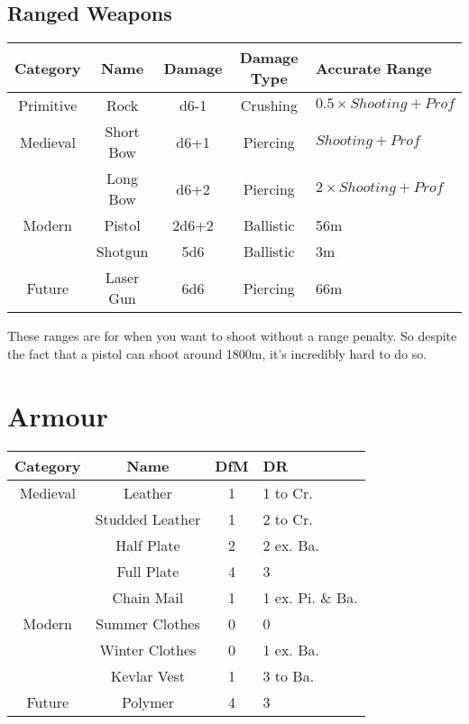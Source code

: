 \subsection{Ranged Weapons}
\begin{center}
\begin{tabular}{c|c|c|c|l}
    \textbf{Category} & \textbf{Name} & \textbf{Damage} & \textbf{Damage Type} & \textbf{Accurate Range} \\\hline
    Primitive & Rock        & d6-1  & Crushing & $0.5 \times Shooting + Prof$  \\\hline
    Medieval  & Short Bow   & d6+1  & Piercing & $Shooting + Prof$ \\
              & Long Bow    & d6+2  & Piercing & $2 \times Shooting + Prof$ \\\hline
    Modern    & Pistol      & 2d6+2 & Ballistic & 56m \\
              & Shotgun     & 5d6   & Ballistic & 3m \\\hline
    Future    & Laser Gun   & 6d6   & Piercing & 66m \\
\end{tabular}
\end{center}
\begin{note} 
    These ranges are for when you want to shoot without a range penalty.
    So despite the fact that a pistol can shoot around 1800m, it's incredibly hard to do so.
\end{note}

\section{Armour} \label{sec:armour}
\begin{center}
\begin{tabular}{c|c|c|l}
\textbf{Category} & \textbf{Name}  & \textbf{DfM} & \textbf{DR}\\\hline
         Medieval & Leather        & 1 & 1 to Cr.\\
                  & Studded Leather& 1 & 2 to Cr.\\
                  & Half Plate     & 2 & 2 ex. Ba.\\
                  & Full Plate     & 4 & 3 \\
                  & Chain Mail     & 1 & 1 ex. Pi. \& Ba.\\\hline
           Modern & Summer Clothes & 0 & 0 \\
                  & Winter Clothes & 0 & 1 ex. Ba.\\
                  & Kevlar Vest    & 1 & 3 to Ba.\\\hline
           Future & Polymer        & 4 & 3 \\
\end{tabular}
\end{center}

